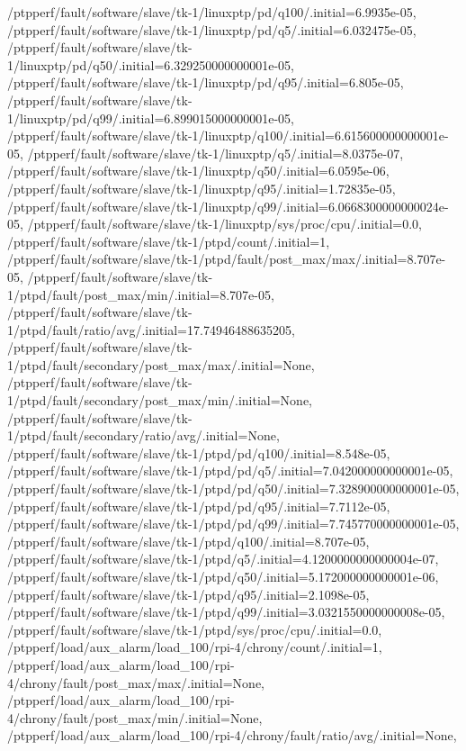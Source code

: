 {    /ptpperf/fault/software/slave/tk-1/linuxptp/pd/q100/.initial=6.9935e-05,
    /ptpperf/fault/software/slave/tk-1/linuxptp/pd/q5/.initial=6.032475e-05,
    /ptpperf/fault/software/slave/tk-1/linuxptp/pd/q50/.initial=6.329250000000001e-05,
    /ptpperf/fault/software/slave/tk-1/linuxptp/pd/q95/.initial=6.805e-05,
    /ptpperf/fault/software/slave/tk-1/linuxptp/pd/q99/.initial=6.899015000000001e-05,
    /ptpperf/fault/software/slave/tk-1/linuxptp/q100/.initial=6.615600000000001e-05,
    /ptpperf/fault/software/slave/tk-1/linuxptp/q5/.initial=8.0375e-07,
    /ptpperf/fault/software/slave/tk-1/linuxptp/q50/.initial=6.0595e-06,
    /ptpperf/fault/software/slave/tk-1/linuxptp/q95/.initial=1.72835e-05,
    /ptpperf/fault/software/slave/tk-1/linuxptp/q99/.initial=6.0668300000000024e-05,
    /ptpperf/fault/software/slave/tk-1/linuxptp/sys/proc/cpu/.initial=0.0,
    /ptpperf/fault/software/slave/tk-1/ptpd/count/.initial=1,
    /ptpperf/fault/software/slave/tk-1/ptpd/fault/post_max/max/.initial=8.707e-05,
    /ptpperf/fault/software/slave/tk-1/ptpd/fault/post_max/min/.initial=8.707e-05,
    /ptpperf/fault/software/slave/tk-1/ptpd/fault/ratio/avg/.initial=17.74946488635205,
    /ptpperf/fault/software/slave/tk-1/ptpd/fault/secondary/post_max/max/.initial=None,
    /ptpperf/fault/software/slave/tk-1/ptpd/fault/secondary/post_max/min/.initial=None,
    /ptpperf/fault/software/slave/tk-1/ptpd/fault/secondary/ratio/avg/.initial=None,
    /ptpperf/fault/software/slave/tk-1/ptpd/pd/q100/.initial=8.548e-05,
    /ptpperf/fault/software/slave/tk-1/ptpd/pd/q5/.initial=7.042000000000001e-05,
    /ptpperf/fault/software/slave/tk-1/ptpd/pd/q50/.initial=7.328900000000001e-05,
    /ptpperf/fault/software/slave/tk-1/ptpd/pd/q95/.initial=7.7112e-05,
    /ptpperf/fault/software/slave/tk-1/ptpd/pd/q99/.initial=7.745770000000001e-05,
    /ptpperf/fault/software/slave/tk-1/ptpd/q100/.initial=8.707e-05,
    /ptpperf/fault/software/slave/tk-1/ptpd/q5/.initial=4.1200000000000004e-07,
    /ptpperf/fault/software/slave/tk-1/ptpd/q50/.initial=5.172000000000001e-06,
    /ptpperf/fault/software/slave/tk-1/ptpd/q95/.initial=2.1098e-05,
    /ptpperf/fault/software/slave/tk-1/ptpd/q99/.initial=3.0321550000000008e-05,
    /ptpperf/fault/software/slave/tk-1/ptpd/sys/proc/cpu/.initial=0.0,
    /ptpperf/load/aux_alarm/load_100/rpi-4/chrony/count/.initial=1,
    /ptpperf/load/aux_alarm/load_100/rpi-4/chrony/fault/post_max/max/.initial=None,
    /ptpperf/load/aux_alarm/load_100/rpi-4/chrony/fault/post_max/min/.initial=None,
    /ptpperf/load/aux_alarm/load_100/rpi-4/chrony/fault/ratio/avg/.initial=None,
}
